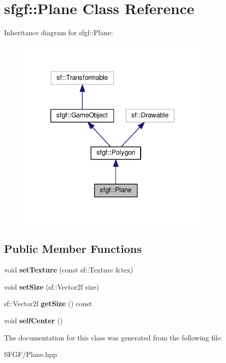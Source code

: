 \hypertarget{classsfgf_1_1Plane}{}\section{sfgf\+:\+:Plane Class Reference}
\label{classsfgf_1_1Plane}


Inheritance diagram for sfgf\+:\+:Plane\+:\nopagebreak
\begin{figure}[H]
\begin{center}
\leavevmode
\includegraphics[width=264pt]{classsfgf_1_1Plane__inherit__graph}
\end{center}
\end{figure}
\subsection*{Public Member Functions}
\begin{DoxyCompactItemize}
\item 
void {\bfseries set\+Texture} (const sf\+::\+Texture \&tex)\hypertarget{classsfgf_1_1Plane_a9a99e5944b94b8a7b565072c73c67a1d}{}\label{classsfgf_1_1Plane_a9a99e5944b94b8a7b565072c73c67a1d}

\item 
void {\bfseries set\+Size} (sf\+::\+Vector2f size)\hypertarget{classsfgf_1_1Plane_a70c92e0de46c76339f37efe40a77b939}{}\label{classsfgf_1_1Plane_a70c92e0de46c76339f37efe40a77b939}

\item 
sf\+::\+Vector2f {\bfseries get\+Size} () const \hypertarget{classsfgf_1_1Plane_ab6f328c5d7cfb2902af7498333a019fe}{}\label{classsfgf_1_1Plane_ab6f328c5d7cfb2902af7498333a019fe}

\item 
void {\bfseries self\+Center} ()\hypertarget{classsfgf_1_1Plane_a30b427bbc8be38c99501b91db6b5a4c0}{}\label{classsfgf_1_1Plane_a30b427bbc8be38c99501b91db6b5a4c0}

\end{DoxyCompactItemize}


The documentation for this class was generated from the following file\+:\begin{DoxyCompactItemize}
\item 
S\+F\+G\+F/Plane.\+hpp\end{DoxyCompactItemize}
